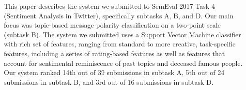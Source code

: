 This paper describes the system we submitted to SemEval-2017 Task 4 (Sentiment Analysis in Twitter), specifically subtasks A, B, and D. Our main focus was topic-based message polarity classification on a two-point scale (subtask B). The system we submitted uses a Support Vector Machine classifier with rich set of features, ranging from standard to more creative, task-specific features, including a series of rating-based features as well as features that account for sentimental reminiscence of past topics and deceased famous people. Our system ranked 14th out of 39 submissions in subtask A, 5th out of 24 submissions in subtask B, and 3rd out of 16 submissions in subtask D.
